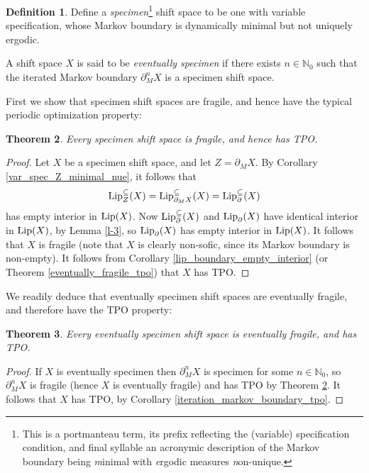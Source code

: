 \documentclass[reqno,11pt]{amsart}
\newtheorem{thm}{Theorem}[section]
\theoremstyle{definition}
\newtheorem{defn}[thm]{Definition}
\theoremstyle{remark}
\theoremstyle{remark}
\def \N {\mathbb N}
\def\lip{{\rm Lip}}
\numberwithin{equation}{section}
\begin{document}
\begin{defn}\label{specimen_defn}
Define a \emph{specimen}\footnote{This is a portmanteau term, its prefix reflecting the (variable) specification condition, and final syllable an acronymic description of the Markov boundary being \emph{m}inimal with \emph{e}rgodic measures 
\emph{n}on-unique.}
  shift space to be one with variable specification, whose Markov boundary is dynamically minimal but not uniquely ergodic.

\noindent
A shift space $X$ is said to be \emph{eventually specimen} if there exists $n\in\N_0$ such that the iterated Markov boundary $\partial_M^n X$ is a specimen shift space.
\end{defn}

First we show that specimen shift spaces  are fragile, and hence have the typical periodic optimization property:

\begin{thm}\label{specimen_implies_TPO}
Every specimen shift space is fragile, and hence has TPO.
\end{thm}
\begin{proof}
Let $X$ be a specimen shift space, and let $Z=\partial_M X$.
By Corollary \ref{var_spec_Z_minimal_nue}, it follows that
$$\lip^\subseteq_Z(X) = \lip^\subseteq_{\partial_M X}(X) = \lip^\subseteq_\partial(X)$$ 
has empty interior in $\lip(X)$.
Now $\lip^\subseteq_\partial(X)$ and $\lip_\partial(X)$ have identical interior in
$\lip(X)$, by Lemma \ref{l-3}, so  $\lip_\partial(X)$ has empty interior in $\lip(X)$.
It follows that $X$ is fragile (note that $X$ is clearly non-sofic, since its Markov boundary is non-empty). 
It follows from Corollary \ref{lip_boundary_empty_interior}
(or Theorem \ref{eventually_fragile_tpo}) that $X$ has TPO.
\end{proof}


We readily deduce that eventually specimen shift spaces are eventually fragile, and therefore have the TPO
property:

\begin{thm}\label{eventually_specimen_implies_TPO}
Every eventually specimen shift space is eventually fragile, and has TPO.
\end{thm}
\begin{proof}
If $X$ is eventually specimen
then $\partial_M^n X$ is specimen for some $n\in\N_0$,
so  $\partial_M^n X$ is fragile (hence $X$ is eventually fragile) and has TPO by Theorem \ref{specimen_implies_TPO}.
It follows that $X$ has TPO, by
Corollary \ref{iteration_markov_boundary_tpo}.
\end{proof}
\end{document}
